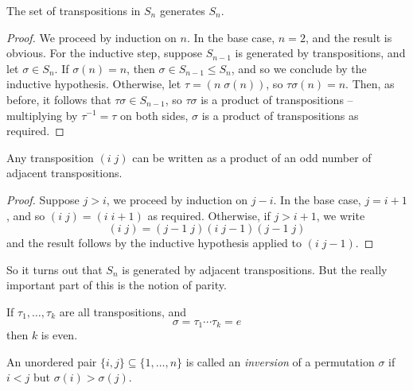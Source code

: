 \documentclass{../../template/note}
\begin{document}
    \begin{theorem}
        The set of transpositions in \(S_n\) generates \(S_n\).
    \end{theorem}
    
    \begin{proof}
        We proceed by induction on \(n\). In the base case, \(n=2\), and the result is obvious. For the inductive step, suppose \(S_{n-1}\) is generated by transpositions, and let \(\sigma \in S_n\). If \(\sigma(n) = n\), then \(\sigma \in S_{n-1} \leq S_n\), and so we conclude by the inductive hypothesis. Otherwise, let \(\tau = (n \; \sigma(n))\), so \(\tau \sigma(n) = n\). Then, as before, it follows that \(\tau \sigma \in S_{n-1}\), so \(\tau \sigma\) is a product of transpositions -- multiplying by \(\tau^{-1} = \tau\) on both sides, \(\sigma\) is a product of transpositions as required.
    \end{proof}

    
    \begin{lemma}
        Any transposition \((i \; j)\) can be written as a product of an odd number of adjacent transpositions.
        \label{adjacent-transpositions}
    \end{lemma}
    
    \begin{proof}
        Suppose \(j > i\), we proceed by induction on \(j-i\). In the base case, \(j=i+1\), and so \((i \; j) = (i \; i+1)\) as required. Otherwise, if \(j>i+1\), we write
        \[
            (i\; j) = (j-1 \; j)(i \; j-1)(j-1 \; j)
        \]
        and the result follows by the inductive hypothesis applied to \((i \; j-1)\).
    \end{proof}
    
    So it turns out that \(S_n\) is generated by adjacent transpositions. But the really important part of this is the notion of parity.

    \begin{lemma}
        If \(\tau_1, \dots, \tau_k\) are all transpositions, and
        \[
            \sigma = \tau_1 \cdots \tau_k = e
        \]
        then \(k\) is even.
    \end{lemma}

    \begin{definition}
        An unordered pair \(\{i, j\} \subseteq \{1, \dots, n\}\) is called an \emph{inversion} of a permutation \(\sigma\) if \(i < j\) but \(\sigma(i) > \sigma(j)\).
    \end{definition}
    
\end{document}
